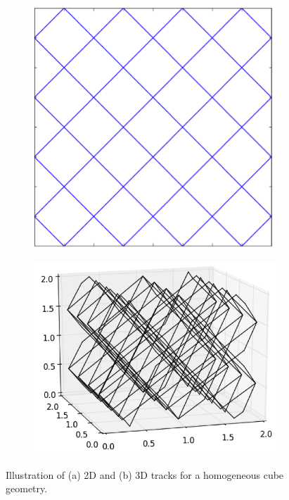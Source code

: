 \begin{figure}[h!]
	\centering
	\begin{subfigure}{0.25\textwidth}
		\centering
		\includegraphics[width=\linewidth]{figures/laydown/sample-tracks_a.png}
		\caption{}
		\label{fig:sample-tracks-a}
	\end{subfigure}
	\begin{subfigure}{0.35\textwidth}
		\centering
		\includegraphics[width=\linewidth]{figures/laydown/sample-tracks_b.png}
		\caption{}
		\label{fig:sample-tracks-b}
	\end{subfigure}
	\caption[]{Illustration of (a) 2D and (b) 3D  tracks for a homogeneous cube geometry.}
	\label{fig:sample-tracks}
\end{figure}


